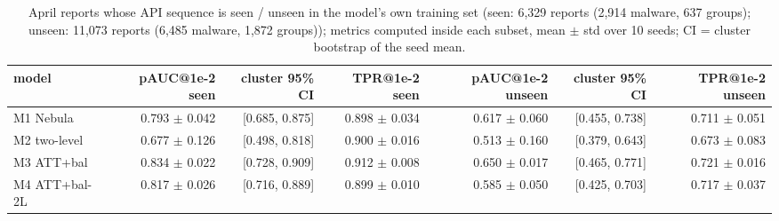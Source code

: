 \begin{table}[t]
\centering
\small
\caption{April reports whose API sequence is seen / unseen in the model's own training set (seen: 6,329 reports (2,914 malware, 637 groups); unseen: 11,073 reports (6,485 malware, 1,872 groups)); metrics computed inside each subset, mean $\pm$ std over 10 seeds; CI = cluster bootstrap of the seed mean.}
\label{tab:T6_seen_unseen}
\begin{tabular}{lrrrrrr}
\toprule
model & pAUC@1e-2 seen & cluster 95\% CI & TPR@1e-2 seen & pAUC@1e-2 unseen & cluster 95\% CI & TPR@1e-2 unseen \\
\midrule
M1 Nebula & 0.793 $\pm$ 0.042 & [0.685, 0.875] & 0.898 $\pm$ 0.034 & 0.617 $\pm$ 0.060 & [0.455, 0.738] & 0.711 $\pm$ 0.051 \\
M2 two-level & 0.677 $\pm$ 0.126 & [0.498, 0.818] & 0.900 $\pm$ 0.016 & 0.513 $\pm$ 0.160 & [0.379, 0.643] & 0.673 $\pm$ 0.083 \\
M3 ATT+bal & 0.834 $\pm$ 0.022 & [0.728, 0.909] & 0.912 $\pm$ 0.008 & 0.650 $\pm$ 0.017 & [0.465, 0.771] & 0.721 $\pm$ 0.016 \\
M4 ATT+bal-2L & 0.817 $\pm$ 0.026 & [0.716, 0.889] & 0.899 $\pm$ 0.010 & 0.585 $\pm$ 0.050 & [0.425, 0.703] & 0.717 $\pm$ 0.037 \\
\bottomrule
\end{tabular}
\end{table}
